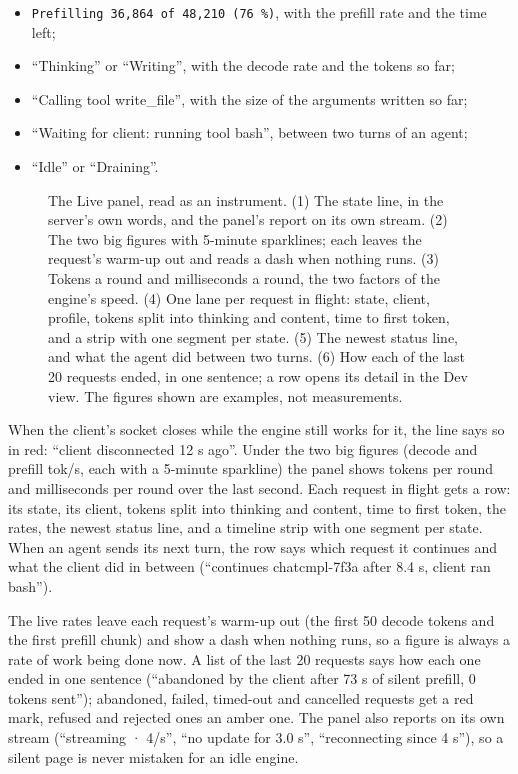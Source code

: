 \begin{itemize}
\item \texttt{Prefilling 36,864 of 48,210 (76\,\%)}, with the prefill rate and the time left;
\item \enquote{Thinking} or \enquote{Writing}, with the decode rate and the tokens so far;
\item \enquote{Calling tool write\_file}, with the size of the arguments written so far;
\item \enquote{Waiting for client: running tool bash}, between two turns of an agent;
\item \enquote{Idle} or \enquote{Draining}.
\end{itemize}

\begin{figure}[htbp]
\centering

\caption[The Live panel as an instrument readout]{The Live panel, read as an instrument. (1) The state line, in the server's own words, and the panel's report on its own stream. (2) The two big figures with 5-minute sparklines; each leaves the request's warm-up out and reads a dash when nothing runs. (3) Tokens a round and milliseconds a round, the two factors of the engine's speed. (4) One lane per request in flight: state, client, profile, tokens split into thinking and content, time to first token, and a strip with one segment per state. (5) The newest status line, and what the agent did between two turns. (6) How each of the last 20 requests ended, in one sentence; a row opens its detail in the Dev view. The figures shown are examples, not measurements.}\label{fig:live-panel}
\end{figure}

When the client's socket closes while the engine still works for it, the line says so in red: \enquote{client disconnected 12 s ago}. Under the two big figures (decode and prefill tok/s, each with a 5-minute sparkline) the panel shows tokens per round and milliseconds per round over the last second. Each request in flight gets a row: its state, its client, tokens split into thinking and content, time to first token, the rates, the newest status line, and a timeline strip with one segment per state. When an agent sends its next turn, the row says which request it continues and what the client did in between (\enquote{continues chatcmpl-7f3a after 8.4 s, client ran bash}).

The live rates leave each request's warm-up out (the first 50 decode tokens and the first prefill chunk) and show a dash when nothing runs, so a figure is always a rate of work being done now. A list of the last 20 requests says how each one ended in one sentence (\enquote{abandoned by the client after 73 s of silent prefill, 0 tokens sent}); abandoned, failed, timed-out and cancelled requests get a red mark, refused and rejected ones an amber one. The panel also reports on its own stream (\enquote{streaming · 4/s}, \enquote{no update for 3.0 s}, \enquote{reconnecting since 4 s}), so a silent page is never mistaken for an idle engine.

